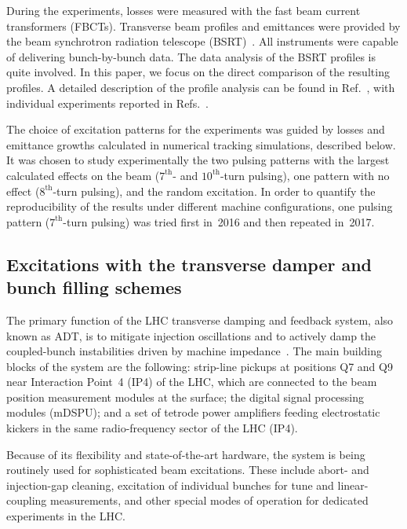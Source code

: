 \documentclass[%
 reprint,
 amsmath,amssymb,
 aps,
prstab,
longbibliography
]{revtex4-1}
\begin{document}
During the experiments, losses were measured with the fast beam
current transformers (FBCTs). Transverse beam profiles and emittances
were provided by the beam synchrotron radiation telescope
(BSRT)~\cite{Trad:PhD:2015}. All instruments were capable of
delivering bunch-by-bunch data. The data analysis of the BSRT profiles
is quite involved. In this paper, we focus on the direct comparison of
the resulting profiles. A detailed description of the profile analysis
can be found in Ref.~\cite{bsrtprofinj}, with individual experiments
reported in Refs.~\cite{resexmd2016, resexmd2017}.

The choice of excitation patterns for the experiments was guided by
losses and emittance growths calculated in numerical tracking
simulations, described below. It was chosen to study experimentally
the two pulsing patterns with the largest calculated effects on the
beam ($7^{\mathrm{th}}$- and $10^{\mathrm{th}}$-turn pulsing), one
pattern with no effect ($8^{\mathrm{th}}$-turn pulsing), and the
random excitation. In order to quantify the reproducibility of the
results under different machine configurations, one pulsing pattern
($7^{\mathrm{th}}$-turn pulsing) was tried first in~2016 and then
repeated in~2017.


\subsection{Excitations with the transverse damper and bunch filling schemes}
\label{sec:adt}

The primary function of the LHC transverse damping and feedback
system, also known as ADT, is to mitigate injection oscillations and
to actively damp the coupled-bunch instabilities driven by machine
impedance~\cite{adt_sum_2008, adt_sum_2011}. The main building blocks
of the system are the following: strip-line pickups at positions Q7
and Q9 near Interaction Point~4 (IP4) of the LHC, which are connected
to the beam position measurement modules at the surface; the digital
signal processing modules (mDSPU); and a set of tetrode power
amplifiers feeding electrostatic kickers in the same radio-frequency
sector of the LHC (IP4).

Because of its flexibility and state-of-the-art hardware, the system
is being routinely used for sophisticated beam excitations. These
include abort- and injection-gap cleaning, excitation of individual
bunches for tune and linear-coupling measurements, and other special
modes of operation for dedicated experiments in the LHC.
\end{document}
